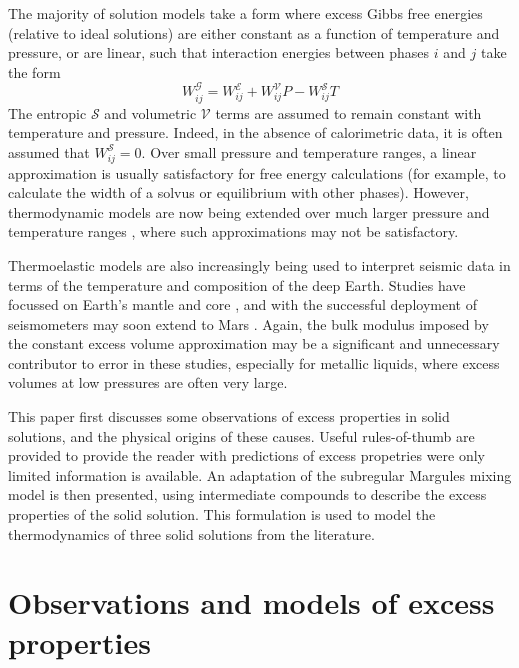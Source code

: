 The majority of solution models take a form where excess Gibbs free energies (relative to ideal solutions) are either constant as a function of temperature and pressure, or are linear, such that interaction energies between phases $i$ and $j$ take the form
\begin{equation}
  W_{ij}^{\mathcal{G}} = W_{ij}^{\mathcal{E}} + W_{ij}^{\mathcal{V}}P - W_{ij}^{\mathcal{S}}T
  \label{eqn:trad_form}
\end{equation}
The entropic $\mathcal{S}$ and volumetric $\mathcal{V}$ terms are assumed to remain constant with temperature and pressure. Indeed, in the absence of calorimetric data, it is often assumed that $W_{ij}^{\mathcal{S}} = 0$. Over small pressure and temperature ranges, a linear approximation is usually satisfactory for free energy calculations (for example, to calculate the width of a solvus or equilibrium with other phases). However, thermodynamic models are now being extended over much larger pressure and temperature ranges \citep{SLB2011, HP2011, HHPH2013, DKS2013}, where such approximations may not be satisfactory.

Thermoelastic models are also increasingly being used to interpret seismic data in terms of the temperature and composition of the deep Earth. Studies have focussed on Earth's mantle \citep[e.g.][]{DGDSBR2012, MCDRT2012, DCT2012} and core \citep[e.g.][]{SGGFMM2000,SFGMM2004}, and with the successful deployment of seismometers may soon extend to Mars \citep{GLZR2014}. Again, the bulk modulus imposed by the constant excess volume approximation may be a significant and unnecessary contributor to error in these studies, especially for metallic liquids, where excess volumes at low pressures are often very large. 

This paper first discusses some observations of excess properties in solid solutions, and the physical origins of these causes. Useful rules-of-thumb are provided to provide the reader with predictions of excess propetries were only limited information is available. An adaptation of the subregular Margules mixing model is then presented, using intermediate compounds to describe the excess properties of the solid solution. This formulation is used to model the thermodynamics of three solid solutions from the literature. 


\section{Observations and models of excess properties} 
